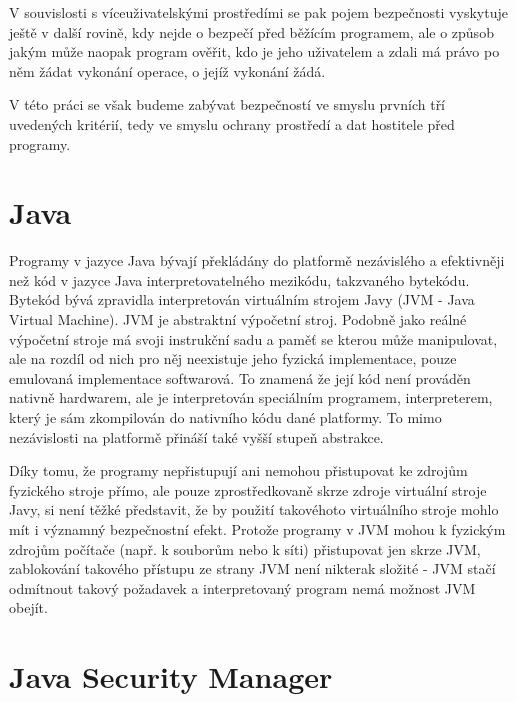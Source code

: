 V souvislosti s víceuživatelskými prostředími se pak pojem bezpečnosti vyskytuje ještě v další rovině, kdy nejde o bezpečí před běžícím programem, ale o způsob jakým může naopak program ověřit, kdo je jeho uživatelem a zdali má právo po něm žádat vykonání operace, o jejíž vykonání žádá.

V této práci se však budeme zabývat bezpečností ve smyslu prvních tří uvedených kritérií, tedy ve smyslu ochrany prostředí a dat hostitele před programy.

\section{Java}

Programy v jazyce Java bývají překládány do platformě nezávislého a efektivněji než kód v jazyce Java interpretovatelného mezikódu, takzvaného bytekódu.
Bytekód bývá zpravidla interpretován virtuálním strojem Javy (JVM - Java Virtual Machine).
JVM je abstraktní výpočetní stroj. Podobně jako reálné výpočetní stroje má svoji instrukční sadu a paměť se kterou může manipulovat, ale na rozdíl od nich pro něj neexistuje jeho fyzická implementace, pouze emulovaná implementace softwarová.
To znamená že její kód není prováděn nativně hardwarem, ale je interpretován speciálním programem, interpreterem, který je sám zkompilován do nativního kódu dané platformy.
To mimo nezávislosti na platformě přináší také vyšší stupeň abstrakce.

Díky tomu, že programy nepřistupují ani nemohou přistupovat ke zdrojům fyzického stroje přímo, ale pouze zprostředkovaně skrze zdroje virtuální stroje Javy, si není těžké představit, že by použití takovéhoto virtuálního stroje mohlo mít i významný bezpečnostní efekt.
Protože programy v JVM mohou k fyzickým zdrojům počítače (např. k souborům nebo k síti) přistupovat jen skrze JVM, zablokování takového přístupu ze strany JVM není nikterak složité - JVM stačí odmítnout takový požadavek a interpretovaný program nemá možnost JVM obejít.

\section{Java Security Manager}

